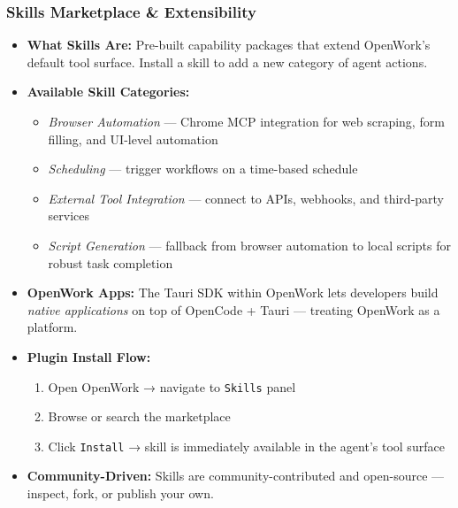\begin{frame}[fragile]\frametitle{Skills Marketplace \& Extensibility}
  \begin{itemize}
    \item \textbf{What Skills Are:} Pre-built capability packages that extend OpenWork's default tool surface. Install a skill to add a new category of agent actions.
    \item \textbf{Available Skill Categories:}
      \begin{itemize}
        \item \textit{Browser Automation} — Chrome MCP integration for web scraping, form filling, and UI-level automation
        \item \textit{Scheduling} — trigger workflows on a time-based schedule
        \item \textit{External Tool Integration} — connect to APIs, webhooks, and third-party services
        \item \textit{Script Generation} — fallback from browser automation to local scripts for robust task completion
      \end{itemize}
    \item \textbf{OpenWork Apps:} The Tauri SDK within OpenWork lets developers build \textit{native applications} on top of OpenCode + Tauri — treating OpenWork as a platform.
    \item \textbf{Plugin Install Flow:}
      \begin{enumerate}
        \item Open OpenWork → navigate to \texttt{Skills} panel
        \item Browse or search the marketplace
        \item Click \texttt{Install} → skill is immediately available in the agent's tool surface
      \end{enumerate}
    \item \textbf{Community-Driven:} Skills are community-contributed and open-source — inspect, fork, or publish your own.
  \end{itemize}
\end{frame}

